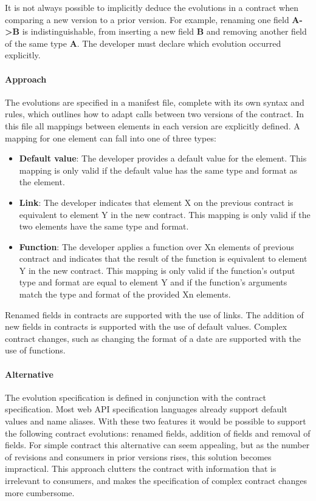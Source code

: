 It is not always possible to implicitly deduce the evolutions in a contract when comparing a new version to a prior version.
For example, renaming one field \textbf{A->B} is indistinguishable, from inserting a new field \textbf{B} and removing another field of the same type \textbf{A}.
The developer must declare which evolution occurred explicitly.

\paragraph{Approach}
The evolutions are specified in a manifest file, complete with its own syntax and rules,
which outlines how to adapt calls between two versions of the contract.
In this file all mappings between elements in each version are explicitly defined.
A mapping for one element can fall into one of three types:
\begin{itemize}
    \item \textbf{Default value}: The developer provides a default value for the element.
    This mapping is only valid if the default value has the same type and format as the element.
    \item \textbf{Link}: The developer indicates that element X on the previous contract is equivalent to element Y in the new contract.
    This mapping is only valid if the two elements have the same type and format.
    \item \textbf{Function}: The developer applies a function over Xn elements of previous contract and indicates that the result of the function is equivalent to element Y in the new contract.
    This mapping is only valid if the function's output type and format are equal to element Y and if the function's arguments match the type and format of the provided Xn elements.
\end{itemize}
Renamed fields in contracts are supported with the use of links.
The addition of new fields in contracts is supported with the use of default values.
Complex contract changes, such as changing the format of a date are supported with the use of functions.

\paragraph{Alternative}
The evolution specification is defined in conjunction with the contract specification.
Most web API specification languages already support default values and name aliases.
With these two features it would be possible
to support the following contract evolutions: renamed fields, addition of fields and removal of fields.
For simple contract this alternative can seem appealing, but as the number of revisions and consumers in prior versions rises, this solution becomes impractical.
This approach clutters the contract with information that is irrelevant to consumers, and makes the specification of complex contract changes more cumbersome.

